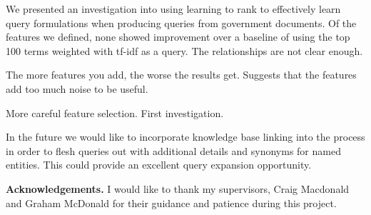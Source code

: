 \documentclass{mpaper}
\begin{document}
We presented an investigation into using learning to rank to effectively learn query formulations when producing queries from government documents. Of the features we defined, none showed improvement over a baseline of using the top 100 terms weighted with tf-idf as a query.
The relationships are not clear enough.


The more features you add, the worse the results get.
Suggests that the features add too much noise to be useful.

More careful feature selection.
First investigation.

In the future we would like to incorporate knowledge base linking into the process in order to flesh queries out with additional details and synonyms for named entities. This could provide an excellent query expansion opportunity.

\vskip8pt \noindent
{\bf Acknowledgements.}
I would like to thank my supervisors, Craig Macdonald and Graham McDonald for their guidance and patience during this project.


\end{document}
